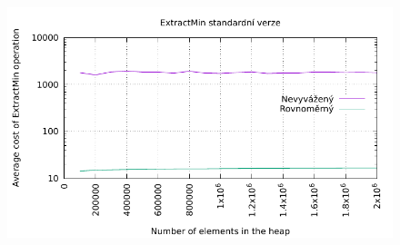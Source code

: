 \documentclass[12pt,a4paper]{report}
\begin{document}
	
	\begin{figure}[h]	
		\centering	
		\includegraphics[scale=1.1]{graph_1}		
	\end{figure}

	\begin{figure}[h]	
    \centering
		\qquad
    \end{figure}
\end{document}
